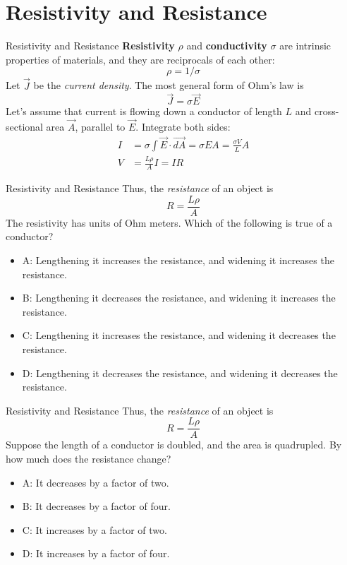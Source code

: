 \documentclass{beamer}
\begin{document}
\section{Resistivity and Resistance}

\begin{frame}{Resistivity and Resistance}
\textbf{Resistivity} $\rho$ and \textbf{conductivity} $\sigma$ are intrinsic properties of materials, and they are reciprocals of each other:
\begin{equation}
\rho = 1/\sigma
\end{equation}
Let $\vec{J}$ be the \textit{current density}.  The most general form of Ohm's law is
\begin{equation}
\boxed{
\vec{J} = \sigma \vec{E}}
\end{equation}
Let's assume that current is flowing down a conductor of length $L$ and cross-sectional area $\vec{A}$, parallel to $\vec{E}$.  Integrate both sides:
\begin{align}
I &= \sigma \int \vec{E} \cdot \vec{dA} = \sigma E A = \frac{\sigma V}{L} A \\
V &= \frac{L \rho}{A} I = I R
\end{align} 
\end{frame}

\begin{frame}{Resistivity and Resistance}
Thus, the \textit{resistance} of an object is 
\begin{equation}
R = \frac{L \rho}{A}
\end{equation}
The resistivity has units of Ohm meters.  Which of the following is true of a conductor?
\begin{itemize}
\item A: Lengthening it increases the resistance, and widening it increases the resistance.
\item B: Lengthening it decreases the resistance, and widening it increases the resistance.
\item C: Lengthening it increases the resistance, and widening it decreases the resistance.
\item D: Lengthening it decreases the resistance, and widening it decreases the resistance.
\end{itemize}
\end{frame}

\begin{frame}{Resistivity and Resistance}
Thus, the \textit{resistance} of an object is 
\begin{equation}
R = \frac{L \rho}{A}
\end{equation}
Suppose the length of a conductor is doubled, and the area is quadrupled.  By how much does the resistance change?
\begin{itemize}
\item A: It decreases by a factor of two.
\item B: It decreases by a factor of four.
\item C: It increases by a factor of two.
\item D: It increases by a factor of four.
\end{itemize}
\end{frame}
\end{document}
